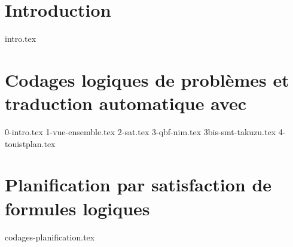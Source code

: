 \documentclass[a4paper,12pt,twoside]{extbook}
\begin{document}
\tableofcontents


\chapter{Introduction}\label{chap:intro}
{intro.tex}



\chapter{Codages logiques de problèmes et traduction automatique avec \touist}\label{chap:touist}

{0-intro.tex}
{1-vue-ensemble.tex}
{2-sat.tex}
{3-qbf-nim.tex}
{3bis-smt-takuzu.tex}
{4-touistplan.tex}

\chapter{Planification par satisfaction de formules logiques}\label{chap:codages}
{codages-planification.tex}

\end{document}

